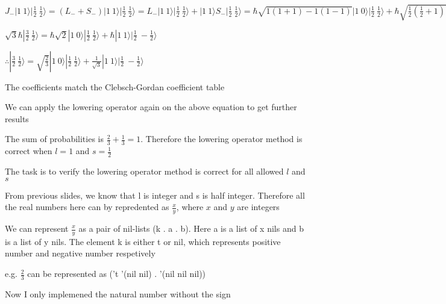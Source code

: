 \documentclass[landscape]{slides}
\begin{document}
$J_{-} |1\ 1\rangle |\frac{1}{2}\ \frac{1}{2}\rangle = (L_{-}+ S_{-}) |1\ 1\rangle |\frac{1}{2}\ \frac{1}{2}\rangle= L_{-}|1\ 1\rangle |\frac{1}{2}\ \frac{1}{2}\rangle + |1\ 1\rangle S_{-} |\frac{1}{2}\ \frac{1}{2}\rangle = \hbar\sqrt{1(1+1)-1(1-1)} |1\ 0\rangle |\frac{1}{2}\ \frac{1}{2}\rangle + \hbar \sqrt{\frac{1}{2} \left( \frac{1}{2}+1 \right) -  \frac{1}{2} \left( \frac{1}{2}-1 \right)} |1\ 1\rangle |\frac{1}{2}\ -\frac{1}{2}\rangle = \hbar \sqrt{2} |1\ 0\rangle |\frac{1}{2}\ \frac{1}{2}\rangle + \hbar |1\ 1\rangle |\frac{1}{2}\ -\frac{1}{2}\rangle$

$\sqrt{3} \hbar |\frac{3}{2}\ \frac{1}{2}\rangle = \hbar \sqrt{2} |1\ 0\rangle |\frac{1}{2}\ \frac{1}{2}\rangle + \hbar |1\ 1\rangle |\frac{1}{2}\ -\frac{1}{2}\rangle$

$\therefore |\frac{3}{2}\ \frac{1}{2}\rangle = \sqrt{\frac{2}{3}} |1\ 0\rangle |\frac{1}{2}\ \frac{1}{2}\rangle + \frac{1}{\sqrt{3}} |1\ 1\rangle |\frac{1}{2}\ -\frac{1}{2}\rangle$

The coefficients match the Clebsch-Gordan coefficient table

We can apply the lowering operator again on the above equation to get further results

The sum of probabilities is $\frac{2}{3}+ \frac{1}{3} = 1$. Therefore the lowering operator method is correct when $l=1$ and $s=\frac{1}{2}$

The task is to verify the lowering operator method is correct for all allowed $l$ and $s$

\clearpage

From previous slides, we know that l is integer and s is half integer. Therefore all the real numbers here can by repredented as $\frac{x}{y}$, where $x$ and $y$ are integers

We can represent $\frac{x}{y}$ as a pair of nil-lists (k . a . b). Here a is a list of x nils and b is a list of y nils. The element k is either t or nil, which represents positive number and negative  number respetively

e.g. $\frac{2}{3}$ can be represented as ('t '(nil nil) . '(nil nil nil))

\clearpage

Now I only implemened the natural number without the sign
\end{document}
